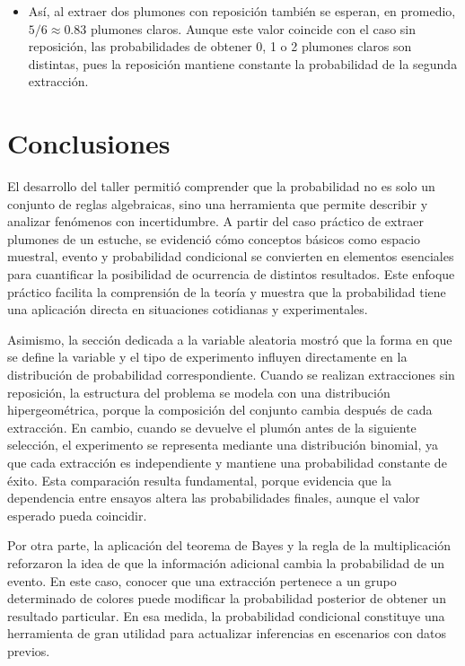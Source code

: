 \documentclass[10pt,letterpaper]{article}
\begin{document}
\begin{itemize}
    \item Así, al extraer dos plumones con reposición también se esperan, en promedio,
    $5/6 \approx 0.83$ plumones claros. Aunque este valor coincide con el caso sin
    reposición, las probabilidades de obtener 0, 1 o 2 plumones claros son distintas,
    pues la reposición mantiene constante la probabilidad de la segunda extracción.
\end{itemize}

\section{Conclusiones}
El desarrollo del taller permitió comprender que la probabilidad no es solo un conjunto de reglas algebraicas, sino una herramienta que permite describir y analizar fenómenos con incertidumbre. A partir del caso práctico de extraer plumones de un estuche, se evidenció cómo conceptos básicos como espacio muestral, evento y probabilidad condicional se convierten en elementos esenciales para cuantificar la posibilidad de ocurrencia de distintos resultados. Este enfoque práctico facilita la comprensión de la teoría y muestra que la probabilidad tiene una aplicación directa en situaciones cotidianas y experimentales.

Asimismo, la sección dedicada a la variable aleatoria mostró que la forma en que se define la variable y el tipo de experimento influyen directamente en la distribución de probabilidad correspondiente. Cuando se realizan extracciones sin reposición, la estructura del problema se modela con una distribución hipergeométrica, porque la composición del conjunto cambia después de cada extracción. En cambio, cuando se devuelve el plumón antes de la siguiente selección, el experimento se representa mediante una distribución binomial, ya que cada extracción es independiente y mantiene una probabilidad constante de éxito. Esta comparación resulta fundamental, porque evidencia que la dependencia entre ensayos altera las probabilidades finales, aunque el valor esperado pueda coincidir.

Por otra parte, la aplicación del teorema de Bayes y la regla de la multiplicación reforzaron la idea de que la información adicional cambia la probabilidad de un evento. En este caso, conocer que una extracción pertenece a un grupo determinado de colores puede modificar la probabilidad posterior de obtener un resultado particular. En esa medida, la probabilidad condicional constituye una herramienta de gran utilidad para actualizar inferencias en escenarios con datos previos.
\end{document}
